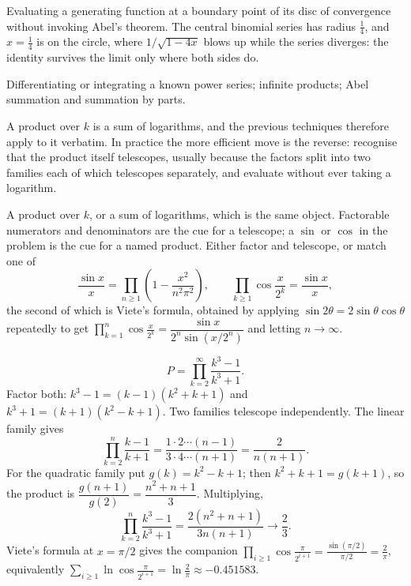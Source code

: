 \begin{trap}
Evaluating a generating function at a boundary point of its disc of convergence without invoking Abel's theorem. The central binomial series has radius $\tfrac14$, and $x=\tfrac14$ is on the circle, where $1/\sqrt{1-4x}$ blows up while the series diverges: the identity survives the limit only where both sides do.
\end{trap}

\begin{seealsob}Differentiating or integrating a known power series; infinite products; Abel summation and summation by parts.\end{seealsob}

A product over $k$ is a sum of logarithms, and the previous techniques therefore apply to it verbatim. In practice the more efficient move is the reverse: recognise that the product itself telescopes, usually because the factors split into two families each of which telescopes separately, and evaluate without ever taking a logarithm.

\cue A product over $k$, or a sum of logarithms, which is the same object. Factorable numerators and denominators are the cue for a telescope; a $\sin$ or $\cos$ in the problem is the cue for a named product.
\method Either factor and telescope, or match one of
\[\frac{\sin x}{x}=\prod_{n\geq1}\left(1-\frac{x^{2}}{n^{2}\pi^{2}}\right),\qquad \prod_{k\geq1}\cos\frac{x}{2^{k}}=\frac{\sin x}{x},\]
the second of which is Viete's formula, obtained by applying $\sin2\theta=2\sin\theta\cos\theta$ repeatedly to get $\prod_{k=1}^{n}\cos\tfrac{x}{2^{k}}=\dfrac{\sin x}{2^{n}\sin(x/2^{n})}$ and letting $n\to\infty$.

\begin{worked}
\[P=\prod_{k=2}^{\infty}\frac{k^{3}-1}{k^{3}+1}.\]
Factor both: $k^{3}-1=(k-1)(k^{2}+k+1)$ and $k^{3}+1=(k+1)(k^{2}-k+1)$. Two families telescope independently. The linear family gives
\[\prod_{k=2}^{n}\frac{k-1}{k+1}=\frac{1\cdot2\cdots(n-1)}{3\cdot4\cdots(n+1)}=\frac{2}{n(n+1)}.\]
For the quadratic family put $g(k)=k^{2}-k+1$; then $k^{2}+k+1=g(k+1)$, so the product is $\dfrac{g(n+1)}{g(2)}=\dfrac{n^{2}+n+1}{3}$. Multiplying,
\[\prod_{k=2}^{n}\frac{k^{3}-1}{k^{3}+1}=\frac{2(n^{2}+n+1)}{3n(n+1)}\longrightarrow\frac23.\]
Viete's formula at $x=\pi/2$ gives the companion $\displaystyle\prod_{i\geq1}\cos\frac{\pi}{2^{i+1}}=\frac{\sin(\pi/2)}{\pi/2}=\frac{2}{\pi}$, equivalently $\sum_{i\geq1}\ln\cos\tfrac{\pi}{2^{i+1}}=\ln\tfrac{2}{\pi}\approx-0.451583$.
\end{worked}

